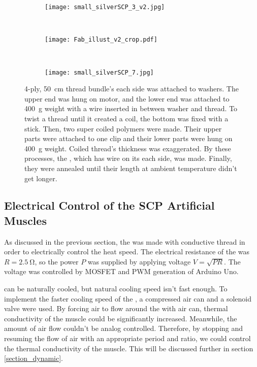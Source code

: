 \begin{figure}
	\centering
	\begin{subfigure}{.15\linewidth}
		\centering\texttt{[image: small\_silverSCP\_3\_v2.jpg]}
		\caption{\label{silverSCP_2}}
	\end{subfigure}
	~
	\begin{subfigure}{.45\linewidth}
		\centering\texttt{[image: Fab\_illust\_v2\_crop.pdf]}
		\caption{\label{silverSCP_illust}}
	\end{subfigure}
	~
	\begin{subfigure}{.15\linewidth}
		\centering\texttt{[image: small\_silverSCP\_7.jpg]}
		\caption{\label{silverSCP_annealing}}
	\end{subfigure}
	\caption[Process of making \scps with silver-painted nylon thread]{ 4-ply, \SI{50}{\centi\meter} thread bundle's each side was attached to washers. The upper end was hung on motor, and the lower end was attached to \SI{400}{\gram} weight with a wire inserted in between washer and thread.  To twist a thread until it created a coil, the bottom was fixed with a stick. Then, two super coiled polymers were made. Their upper parts were attached to one clip and their lower parts were hung on \SI{400}{\gram} weight. Coiled thread's thickness was exaggerated.  By these processes, the \scpnospace, which has wire on its each side, was made. Finally, they were annealed until their length at ambient temperature didn't get longer.}
	\label{silverSCP_makingof}
\end{figure}

\subsection{Electrical Control of the SCP Artificial Muscles}\label{section_electrical_control}
As discussed in the previous section, the \scp was made with conductive thread in order to electrically control the heat speed. The electrical resistance of the \scp was $R=\SI{2.5}{\ohm}$, so the power $P$ was supplied by applying voltage $V=\sqrt{PR}$. The voltage was controlled by MOSFET and PWM generation of Arduino Uno.

\scp can be naturally cooled, but natural cooling speed isn't fast enough.
To implement the faster cooling speed of the \scpnospace, a compressed air can and a solenoid valve were used. 
By forcing air to flow around the \scp with air can, thermal conductivity of the muscle could be significantly increased.
Meanwhile, the amount of air flow couldn't be analog controlled. Therefore, by stopping and resuming the flow of air with an appropriate period and ratio, we could control the thermal conductivity of the muscle. This will be discussed further in section \ref{section_dynamic}.


